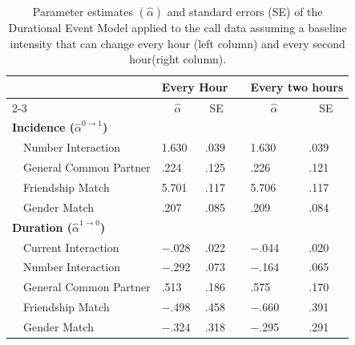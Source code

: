 \begin{table}[t!]
\caption{Parameter estimates $(\hat{\alpha})$ and standard errors (SE) of the Durational Event Model applied to the call data assuming a baseline intensity that can change every hour (left column) and every second hour(right column). \label{tbl:results_sens_call}} 
\begin{center}
\begin{tabular}{lllcll}
\hline
\multicolumn{1}{l}{\bfseries }&\multicolumn{2}{c}{\bfseries Every Hour}&\multicolumn{1}{l}{\bfseries }&\multicolumn{2}{c}{\bfseries Every two hours}\tabularnewline
\cline{2-3} \cline{5-6}
\multicolumn{1}{l}{}&\multicolumn{1}{c}{$\hat{\alpha}$}&\multicolumn{1}{c}{SE}&\multicolumn{1}{c}{}&\multicolumn{1}{c}{$\hat{\alpha}$}&\multicolumn{1}{c}{SE}\tabularnewline
\hline
{\bfseries Incidence ($\hat \alpha^{0\rightarrow 1}$)}&&&&&\tabularnewline
~~Number Interaction&1.630&.039&&1.630&.039\tabularnewline
~~General Common Partner&.224&.125&&.226&.121\tabularnewline
~~Friendship Match&5.701&.117&&5.706&.117\tabularnewline
~~Gender Match&.207&.085&&.209&.084\tabularnewline
\hline
{\bfseries Duration ($\hat \alpha^{1\rightarrow 0}$)}&&&&&\tabularnewline
~~Current Interaction&$-$.028&.022&&$-$.044&.020\tabularnewline
~~Number Interaction&$-$.292&.073&&$-$.164&.065\tabularnewline
~~General Common Partner&.513&.186&&.575&.170\tabularnewline
~~Friendship Match&$-$.498&.458&&$-$.660&.391\tabularnewline
~~Gender Match&$-$.324&.318&&$-$.295&.291\tabularnewline
\hline
\end{tabular}\end{center}
\end{table}
